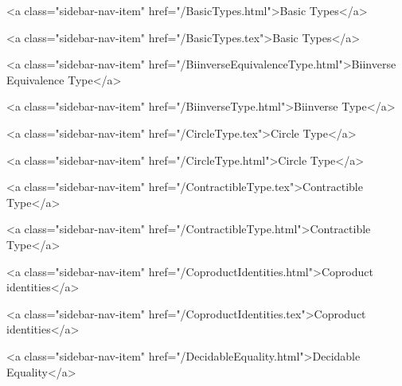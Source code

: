       
        
          <a class="sidebar-nav-item" href="/BasicTypes.html">Basic Types</a>
        
      
    
      
        
          <a class="sidebar-nav-item" href="/BasicTypes.tex">Basic Types</a>
        
      
    
      
        
          <a class="sidebar-nav-item" href="/BiinverseEquivalenceType.html">Biinverse Equivalence Type</a>
        
      
    
      
        
          <a class="sidebar-nav-item" href="/BiinverseType.html">Biinverse Type</a>
        
      
    
      
        
          <a class="sidebar-nav-item" href="/CircleType.tex">Circle Type</a>
        
      
    
      
        
          <a class="sidebar-nav-item" href="/CircleType.html">Circle Type</a>
        
      
    
      
        
          <a class="sidebar-nav-item" href="/ContractibleType.tex">Contractible Type</a>
        
      
    
      
        
          <a class="sidebar-nav-item" href="/ContractibleType.html">Contractible Type</a>
        
      
    
      
        
          <a class="sidebar-nav-item" href="/CoproductIdentities.html">Coproduct identities</a>
        
      
    
      
        
          <a class="sidebar-nav-item" href="/CoproductIdentities.tex">Coproduct identities</a>
        
      
    
      
        
          <a class="sidebar-nav-item" href="/DecidableEquality.html">Decidable Equality</a>
        
